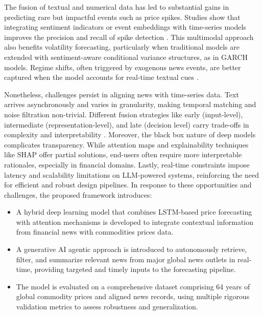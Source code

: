 \documentclass[12pt]{elsarticle}
\begin{document}
The fusion of textual and numerical data has led to substantial gains in predicting rare but impactful events such as price spikes. Studies show that integrating sentiment indicators or event embeddings with time-series models improves the precision and recall of spike detection \cite{Ding2015,Li2021,Chen2024}. This multimodal approach also benefits volatility forecasting, particularly when traditional models are extended with sentiment-aware conditional variance structures, as in GARCH models. Regime shifts, often triggered by exogenous news events, are better captured when the model accounts for real-time textual cues \cite{Ramyar2019}.

Nonetheless, challenges persist in aligning news with time-series data. Text arrives asynchronously and varies in granularity, making temporal matching and noise filtration non-trivial. Different fusion strategies like early (input-level), intermediate (representation-level), and late (decision level) carry trade-offs in complexity and interpretability \cite{Jiang2024}. Moreover, the black box nature of deep models complicates transparency. While attention maps and explainability techniques like SHAP offer partial solutions, end-users often require more interpretable rationales, especially in financial domains. Lastly, real-time constraints impose latency and scalability limitations on LLM-powered systems, reinforcing the need for efficient and robust design pipelines.
\newline
In response to these opportunities and challenges, the proposed framework introduces:
\begin{itemize}
\item A hybrid deep learning model that combines LSTM-based price forecasting with attention mechanisms is developed to integrate contextual information from financial news with commodities prices data.
\item A generative AI agentic approach is introduced to autonomously retrieve, filter, and summarize relevant news from major global news outlets in real-time, providing targeted and timely inputs to the forecasting pipeline.
\item The model is evaluated on a comprehensive dataset comprising 64 years of global commodity prices and aligned news records, using multiple rigorous validation metrics to assess robustness and generalization.
\end{itemize}
\end{document}
